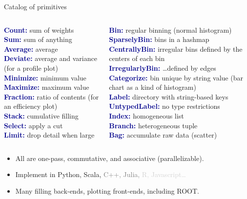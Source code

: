 \documentclass{beamer}
\begin{document}
\begin{frame}{Catalog of primitives}

\vspace{0.5 cm}
\begin{columns}
\textcolor{darkblue}{\bf Count:} sum of weights \\
\textcolor{darkblue}{\bf Sum:} sum of anything \\
\textcolor{darkblue}{\bf Average:} average \\
\textcolor{darkblue}{\bf Deviate:} average and variance (for a profile plot) \\
\textcolor{darkblue}{\bf Minimize:} minimum value \\
\textcolor{darkblue}{\bf Maximize:} maximum value \\
\textcolor{darkblue}{\bf Fraction:} ratio of contents (for an efficiency plot) \\
\textcolor{darkblue}{\bf Stack:} cumulative filling \\
\textcolor{darkblue}{\bf Select:} apply a cut \\
\textcolor{darkblue}{\bf Limit:} drop detail when large

\textcolor{darkblue}{\bf Bin:} regular binning (normal histogram) \\
\textcolor{darkblue}{\bf SparselyBin:} bins in a hashmap \\
\textcolor{darkblue}{\bf CentrallyBin:} irregular bins defined by the centers of each bin \\
\textcolor{darkblue}{\bf IrregularlyBin:} \ldots defined by edges \\
\textcolor{darkblue}{\bf Categorize:} bin unique by string value (bar chart as a kind of histogram) \\
\textcolor{darkblue}{\bf Label:} directory with string-based keys \\
\textcolor{darkblue}{\bf UntypedLabel:} no type restrictions \\
\textcolor{darkblue}{\bf Index:} homogeneous list \\
\textcolor{darkblue}{\bf Branch:} heterogeneous tuple \\
\textcolor{darkblue}{\bf Bag:} accumulate raw data (scatter) \\
\end{columns}

\vspace{0.25 cm}
\begin{itemize}
\item All are one-pass, commutative, and associative (parallelizable).
\item Implement in Python, Scala, \textcolor{gray}{C++, Julia,} \textcolor{lightgray}{R, Javascript\ldots}
\item Many filling back-ends, plotting front-ends, including ROOT.
\end{itemize}
\end{frame}
\end{document}
